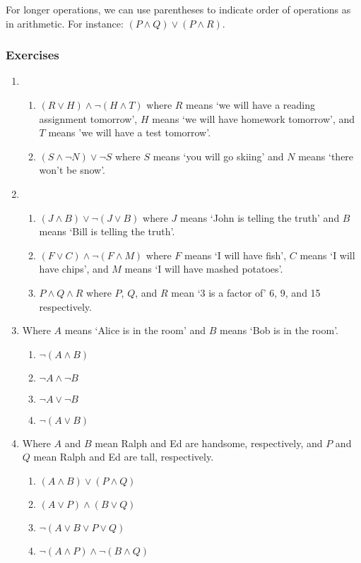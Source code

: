 \documentclass[a4paper, 11pt]{article}
\begin{document}
For longer operations, we can use parentheses to indicate order of operations as in arithmetic. For instance: $(P \wedge Q) \vee (P \wedge R)$.

\clearpage

\subsubsection{Exercises}
\begin{enumerate}
  \item
        \begin{enumerate}
          \item $(R \vee H) \wedge \neg(H \wedge T)$ where $R$ means `we will have a reading assignment tomorrow', $H$ means `we will have homework tomorrow', and $T$ means 'we will have a test tomorrow'.
          \item $(S \wedge \neg N) \vee \neg S$ where $S$ means `you will go skiing' and $N$ means `there won't be snow'.
        \end{enumerate}

  \item
        \begin{enumerate}
          \item $(J \wedge B) \vee \neg(J \vee B)$ where $J$ means `John is telling the truth' and $B$ means `Bill is telling the truth'.
          \item $(F \vee C) \wedge \neg(F \wedge M)$ where $F$ means `I will have fish', $C$ means `I will have chips', and $M$ means `I will have mashed potatoes'.
          \item $P \wedge Q \wedge R$ where $P$, $Q$, and $R$ mean `3 is a factor of' 6, 9, and 15 respectively.
        \end{enumerate}

  \item Where $A$ means `Alice is in the room' and $B$ means `Bob is in the room'.
        \begin{enumerate}
          \item $\neg (A \wedge B)$
          \item $\neg A \wedge \neg B$
          \item $\neg A \vee \neg B$
          \item $\neg (A \vee B)$
        \end{enumerate}

  \item Where $A$ and $B$ mean Ralph and Ed are handsome, respectively, and $P$ and $Q$ mean Ralph and Ed are tall, respectively.
        \begin{enumerate}
          \item $(A \wedge B) \vee (P \wedge Q)$
          \item $(A \vee P) \wedge (B \vee Q)$
          \item $\neg (A \vee B \vee P \vee Q)$
          \item $\neg(A \wedge P) \wedge \neg(B \wedge Q)$
        \end{enumerate}


\end{enumerate}
\end{document}
